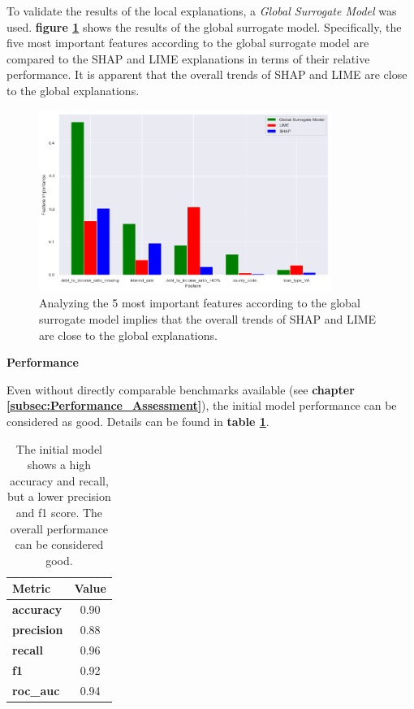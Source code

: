 To validate the results of the local explanations, a \textit{Global Surrogate Model} was used. \textbf{figure \ref{fig:Global_Surrogate}} shows the results of the global surrogate model. Specifically, the five most important features according to the global surrogate model are compared to the SHAP and LIME explanations in terms of their relative performance.
It is apparent that the overall trends of SHAP and LIME are close to the global explanations.

\begin{figure}[h]
    \centering
    \caption{Global Surrogate Model compared to SHAP and LIME}
    \includegraphics[width=0.85\textwidth]{images/CHXX_UPDATE_Surrogate_SHAP_LIME_combined.png}
    \caption*{Analyzing the 5 most important features according to the global surrogate model implies that the overall trends of SHAP and LIME are close to the global explanations.}
    \label{fig:Global_Surrogate}
\end{figure}

\textbf{Performance}

Even without directly comparable benchmarks available (see \textbf{chapter \ref{subsec:Performance_Assessment}}), the initial model performance can be considered as good. Details can be found in \textbf{table \ref{tab:initial_model_performance_results_1}}.

\begin{table}[h]
    \centering
    \caption{Metrics \#1: Initial Model}
    \begin{tabular}{l c}
    \toprule
    \textbf{Metric} & \textbf{Value} \\
    \midrule
    \textbf{accuracy} & 0.90 \\
    \textbf{precision} & 0.88 \\
    \textbf{recall} & 0.96 \\
    \textbf{f1} & 0.92 \\
    \textbf{roc\_auc} & 0.94 \\
    \bottomrule
    \end{tabular}
    \caption*{The initial model shows a high accuracy and recall, but a lower precision and f1 score. The overall performance can be considered good.}
    \label{tab:initial_model_performance_results_1}
\end{table}

